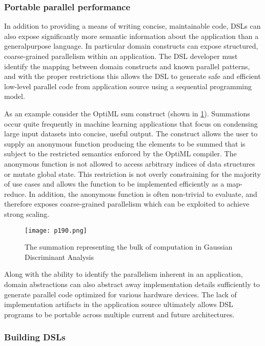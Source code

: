 \subsubsection{Portable parallel performance}
In addition to providing a means of writing concise,
maintainable code, DSLs can also expose significantly more
semantic information about the application than a generalpurpose language. In particular domain constructs can expose
structured, coarse-grained parallelism within an application.
The DSL developer must identify the mapping between domain constructs and known parallel patterns, and with the
proper restrictions this allows the DSL to generate safe and
efficient low-level parallel code from application source using
a sequential programming model.

As an example consider the OptiML sum construct (shown
in \ref{fig:p190}). Summations occur quite frequently in machine
learning applications that focus on condensing large input
datasets into concise, useful output. The construct allows the
user to supply an anonymous function producing the elements
to be summed that is subject to the restricted semantics
enforced by the OptiML compiler. The anonymous function
is not allowed to access arbitrary indices of data structures or
mutate global state. This restriction is not overly constraining
for the majority of use cases and allows the function to
be implemented efficiently as a map-reduce. In addition,
the anonymous function is often non-trivial to evaluate, and
therefore exposes coarse-grained parallelism which can be
exploited to achieve strong scaling.


\begin{figure}[H]
	\centering
	\texttt{[image: p190.png]}
	\caption{The summation representing the bulk of computation in Gaussian Discriminant Analysis}
	\label{fig:p190}
\end{figure}

Along with the ability to identify the parallelism inherent in an application, domain abstractions can also abstract
away implementation details sufficiently to generate parallel
code optimized for various hardware devices. The lack of
implementation artifacts in the application source ultimately
allows DSL programs to be portable across multiple current
and future architectures.

\subsubsection{Building DSLs}


